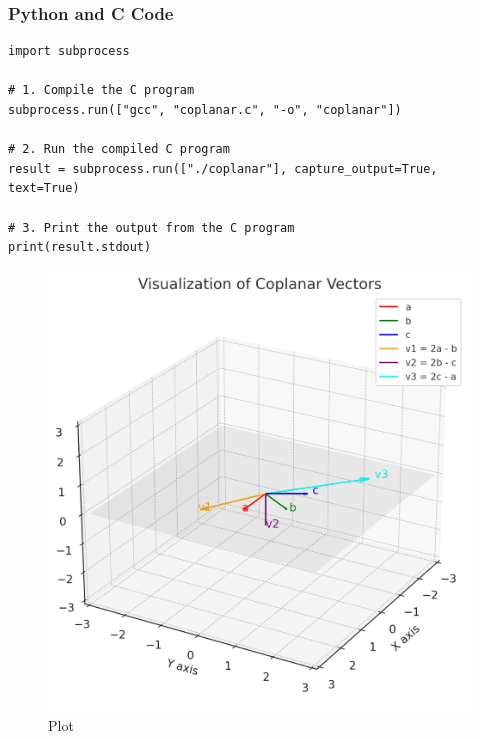 \documentclass{beamer}
\begin{document}
\begin{frame}[fragile]
\frametitle{Python and C Code}

\begin{lstlisting}
import subprocess

# 1. Compile the C program
subprocess.run(["gcc", "coplanar.c", "-o", "coplanar"])

# 2. Run the compiled C program
result = subprocess.run(["./coplanar"], capture_output=True, text=True)

# 3. Print the output from the C program
print(result.stdout)
\end{lstlisting}
\end{frame}

\begin{frame}
\begin{figure}[H]
    \centering
    \includegraphics[width=0.7\columnwidth]{graph-1.png}
    \caption{Plot}
    \label{fig:placeholder}
\end{figure}
\end{frame}
\end{document}
